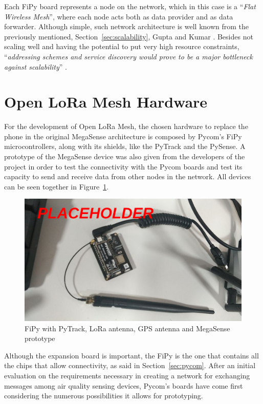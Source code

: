 		Each FiPy board represents a node on the network, which in this case is a ``\textit{Flat Wireless Mesh}'', where each node acts both as data provider and as data forwarder.
		Although simple, such network architecture is well known from the previously mentioned, Section~\ref{sec:scalability}, Gupta and Kumar \cite{825799}.
		Besides not scaling well and having the potential to put very high resource constraints, ``\textit{addressing schemes and service discovery would prove to be a major bottleneck against scalability}'' \cite{92000412}.

	\section{Open LoRa Mesh Hardware}\label{sec:hardware_solution}
	
		For the development of Open LoRa Mesh, the chosen hardware to replace the phone in the original MegaSense architecture is composed by Pycom's FiPy microcontrollers, along with its shields, like the PyTrack and the PySense.
		A prototype of the MegaSense device was also given from the developers of the project in order to test the connectivity with the Pycom boards and test its capacity to send and receive data from other nodes in the network.
		All devices can be seen together in Figure~\ref{img:irl_picture_1}.
		
		\begin{figure}[h]
			\centering
			\includegraphics[width=\textwidth]{resources/img/chap5/mesh-irl-picture}
			\caption{FiPy with PyTrack, LoRa antenna, GPS antenna and MegaSense prototype}
			\label{img:irl_picture_1}
		\end{figure}
		
		Although the expansion board is important, the FiPy is the one that contains all the chips that allow connectivity, as said in Section~\ref{sec:pycom}.
		After an initial evaluation on the requirements necessary in creating a network for exchanging messages among air quality sensing devices, Pycom's boards have come first considering the numerous possibilities it allows for prototyping.
		

